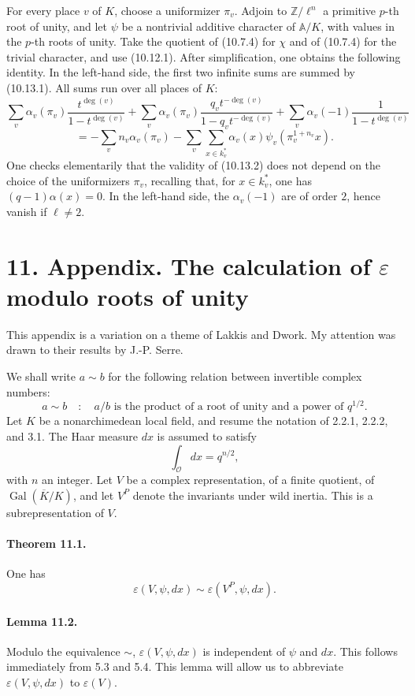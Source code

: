 \documentclass[10pt]{article}
\newcommand{\Gal}{\operatorname{Gal}}
\providecommand{\OO}{\mathcal O}
\providecommand{\OO}{\mathcal O}
\providecommand{\bbA}{\mathbb A}
\providecommand{\OO}{\mathcal O}
\providecommand{\bbA}{\mathbb A}
\providecommand{\OO}{\mathcal O}
\providecommand{\Gal}{\operatorname{Gal}}
\providecommand{\bbA}{\mathbb A}
\providecommand{\OO}{\mathcal O}
\providecommand{\Gal}{\operatorname{Gal}}
\providecommand{\bbA}{\mathbb A}
\providecommand{\OO}{\mathcal O}
\providecommand{\Gal}{\operatorname{Gal}}
\providecommand{\bbA}{\mathbb A}
\providecommand{\OO}{\mathcal O}
\providecommand{\Gal}{\operatorname{Gal}}
\begin{document}
For every place \(v\) of \(K\), choose a uniformizer \(\pi_v\). Adjoin to \(\mathbb Z/\ell^n\) a primitive \(p\)-th root of unity, and let \(\psi\) be a nontrivial additive character of \(\bbA/K\), with values in the \(p\)-th roots of unity. Take the quotient of (10.7.4) for \(\chi\) and of (10.7.4) for the trivial character, and use (10.12.1). After simplification, one obtains the following identity. In the left-hand side, the first two infinite sums are summed by (10.13.1). All sums run over all places of \(K\):
\[
\tag{10.13.2}
\sum_v\alpha_v(\pi_v)\frac{t^{\deg(v)}}{1-t^{\deg(v)}}
+
\sum_v\alpha_v(\pi_v)\frac{q_vt^{-\deg(v)}}{1-q_vt^{-\deg(v)}}
+
\sum_v\alpha_v(-1)\frac{1}{1-t^{\deg(v)}}
\]
\[
=
-\sum_v n_v\alpha_v(\pi_v)
-\sum_v\sum_{x\in k_v^*}\alpha_v(x)\psi_v(\pi_v^{1+n_v}x).
\]
One checks elementarily that the validity of (10.13.2) does not depend on the choice of the uniformizers \(\pi_v\), recalling that, for \(x\in k_v^*\), one has \((q-1)\alpha(x)=0\). In the left-hand side, the \(\alpha_v(-1)\) are of order \(2\), hence vanish if \(\ell\ne2\).

\section*{11. Appendix. The calculation of \(\varepsilon\) modulo roots of unity}

This appendix is a variation on a theme of Lakkis and Dwork. My attention was drawn to their results by J.-P. Serre.

We shall write \(a\sim b\) for the following relation between invertible complex numbers:
\[
a\sim b\quad:\quad a/b\text{ is the product of a root of unity and a power of }q^{1/2}.
\]
Let \(K\) be a nonarchimedean local field, and resume the notation of 2.2.1, 2.2.2, and 3.1. The Haar measure \(dx\) is assumed to satisfy
\[
\int_{\OO}dx=q^{n/2},
\]
with \(n\) an integer. Let \(V\) be a complex representation, of a finite quotient, of \(\Gal(\overline K/K)\), and let \(V^P\) denote the invariants under wild inertia. This is a subrepresentation of \(V\).

\paragraph{Theorem 11.1.} One has
\[
\varepsilon(V,\psi,dx)\sim\varepsilon(V^P,\psi,dx).
\]

\paragraph{Lemma 11.2.} Modulo the equivalence \(\sim\), \(\varepsilon(V,\psi,dx)\) is independent of \(\psi\) and \(dx\). This follows immediately from 5.3 and 5.4. This lemma will allow us to abbreviate \(\varepsilon(V,\psi,dx)\) to \(\varepsilon(V)\).
\end{document}
